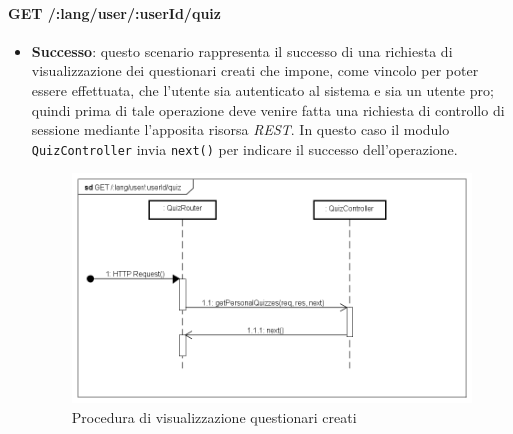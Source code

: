 \paragraph{GET /:lang/user/:userId/quiz} %
\begin{itemize}
\item \textbf{Successo}: questo scenario rappresenta il successo di una richiesta di visualizzazione dei questionari creati che impone, come vincolo per poter essere effettuata, che l'utente sia autenticato al sistema e sia un utente pro; quindi prima di tale operazione deve venire fatta una richiesta di controllo di sessione mediante l'apposita risorsa \textit{REST}. In questo caso il modulo \texttt{QuizController} invia \texttt{next()} per indicare il successo dell'operazione.
\label{Procedura di visualizzazione questionari creati}
\begin{figure}[ht]
	\centering
	\includegraphics[scale=0.55]{UML/DiagrammiDiSequenza/Back-end/GET__lang_user_userId_quiz_success.png}
	\caption{Procedura di visualizzazione questionari creati}
\end{figure}
\FloatBarrier


\end{itemize}
